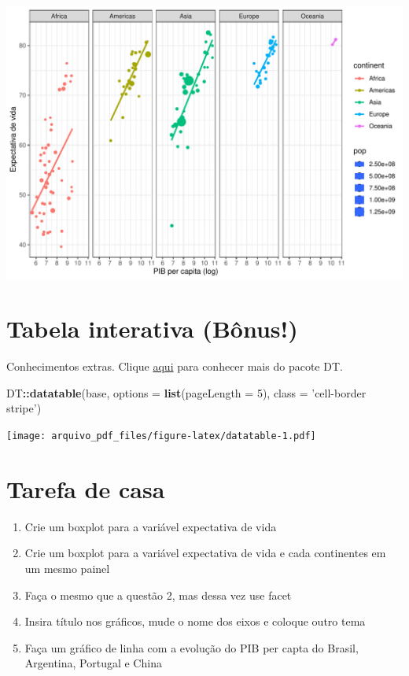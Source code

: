 \documentclass[
]{article}
\newenvironment{Shaded}{\begin{snugshade}}{\end{snugshade}}
\newcommand{\DataTypeTok}[1]{\textcolor[rgb]{0.13,0.29,0.53}{#1}}
\newcommand{\DecValTok}[1]{\textcolor[rgb]{0.00,0.00,0.81}{#1}}
\newcommand{\KeywordTok}[1]{\textcolor[rgb]{0.13,0.29,0.53}{\textbf{#1}}}
\newcommand{\NormalTok}[1]{#1}
\newcommand{\OperatorTok}[1]{\textcolor[rgb]{0.81,0.36,0.00}{\textbf{#1}}}
\newcommand{\StringTok}[1]{\textcolor[rgb]{0.31,0.60,0.02}{#1}}
\begin{document}
\begin{center}\includegraphics{arquivo_pdf_files/figure-latex/scatter5-1} \end{center}

\hypertarget{tabela-interativa-buxf4nus}{%
\section{Tabela interativa (Bônus!)}\label{tabela-interativa-buxf4nus}}

Conhecimentos extras. Clique \href{https://rstudio.github.io/DT/}{aqui}
para conhecer mais do pacote DT.

\begin{Shaded}
\begin{Highlighting}[]
\NormalTok{DT}\OperatorTok{::}\KeywordTok{datatable}\NormalTok{(base, }\DataTypeTok{options =} \KeywordTok{list}\NormalTok{(}\DataTypeTok{pageLength =} \DecValTok{5}\NormalTok{), }\DataTypeTok{class =} \StringTok{'cell-border stripe'}\NormalTok{)}
\end{Highlighting}
\end{Shaded}

\texttt{[image: arquivo\_pdf\_files/figure-latex/datatable-1.pdf]}

\hypertarget{tarefa-de-casa}{%
\section{Tarefa de casa}\label{tarefa-de-casa}}

\begin{enumerate}
\def\labelenumi{\arabic{enumi})}
\item
  Crie um boxplot para a variável expectativa de vida
\item
  Crie um boxplot para a variável expectativa de vida e cada continentes
  em um mesmo painel
\item
  Faça o mesmo que a questão 2, mas dessa vez use facet
\item
  Insira título nos gráficos, mude o nome dos eixos e coloque outro tema
\item
  Faça um gráfico de linha com a evolução do PIB per capta do Brasil,
  Argentina, Portugal e China
\end{enumerate}
\end{document}
